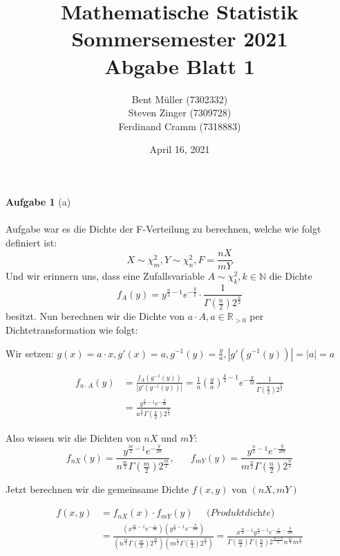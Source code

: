 \documentclass[12pt]{article}
\title{Mathematische Statistik \\ Sommersemester 2021 \\ Abgabe Blatt 1 \\}
\author{Bent Müller (7302332) \\ Steven Zinger (7309728) \\ Ferdinand Cramm (7318883)}
\date{April 16, 2021}
\begin{document}
\maketitle
\textbf{Aufgabe 1} (a) \\\\Aufgabe war es die Dichte der F-Verteilung zu berechnen, welche wie folgt definiert ist:
\[
	X \sim \chi^2_m, Y \sim \chi^2_n, F = \frac{nX}{mY}
\] 
Und wir erinnern uns, dass eine Zufallsvariable $A \sim \chi^2_k, k \in \mathbb{N}$ die Dichte
\[
	f_A(y) = y^{\frac{n}{2} - 1} e^{-\frac{y}{2}} \cdot
	\frac{1}{
		\Gamma(\frac{n}{2}) 2^{\frac{n}{2}}
	}
\]
besitzt.
Nun berechnen wir die Dichte von $a \cdot A, a \in \mathbb{R}_{>0}$ per Dichtetransformation wie folgt:

Wir setzen:
$
	g(x) = a \cdot x,
	g'(x) = a,
	g ^{-1} (y) = \frac{y}{a},
	|g' (g ^{-1} (y))| = |a| = a
$

\begin{align*}
	f_{a\cdot A}(y) &= \frac{ f_A ( g ^{-1} (y)) }{ | g' ( g ^{-1} (y) ) | }
	= \frac{ 1 }{ a } \left( \frac{ y }{ a } \right) ^{ \frac{ k }{ 2 } - 1 }
	e ^{- \frac{ y }{ 2a }} \frac{ 1 }{ \Gamma(\frac{ k }{ 2 }) 2 ^{\frac{ k }{ 2 }}}\\
					&= \frac{y ^{ \frac{ k }{ 2 } -1} e ^{ - \frac{ y }{ 2a }}}{
						a ^{ \frac{ k }{ 2 } } \Gamma(\frac{ k }{ 2 }) 2 ^{ \frac{ k }{ 2 } }
					}
\end{align*}

Also wissen wir die Dichten von $nX$ und $mY$:
\[
	f_{nX}(y) = \frac{ y ^{ \frac{ m }{ 2 } -1} e ^{ - \frac{ y }{ 2n }} }{ 
		n ^{ \frac{ m }{ 2 } } \Gamma(\frac{ m }{ 2}) 2 ^{\frac{ m }{ 2 }}
	},\;\;\;\;\;\;
	f_{mY}(y) = \frac{ y ^{ \frac{ n }{ 2 } -1} e ^{ - \frac{ y }{ 2m }} }{ 
		m ^{ \frac{ n }{ 2 } } \Gamma(\frac{ n }{ 2}) 2 ^{\frac{ n }{ 2 }}
	}
\] 

Jetzt berechnen wir die gemeinsame Dichte $f(x, y)$ von $(nX, mY)$

\begin{align*}
	f(x, y) &= f_{nX}(x) \cdot f_{mY}(y) \;\;\;\;\; \textit{(Produktdichte)} \\
			&= \frac{ 
				\left( x ^{\frac{ m }{ 2 }-1} e ^{- \frac{ x }{ 2n }} \right) 
				\left( y ^{\frac{ n }{ 2 }-1} e ^{- \frac{ y }{ 2m }} \right) 
				}{  
				\left( n ^{\frac{ m }{ 2 }} \Gamma(\frac{ m }{ 2 }) 2 ^{\frac{ m }{ 2 }} \right) 
				\left( m ^{\frac{ n }{ 2 }} \Gamma(\frac{ n }{ 2 }) 2 ^{\frac{ n }{ 2 }} \right)
			}
			= \frac{ 
				x ^{\frac{ m }{ 2 } - 1} y ^{\frac{ n }{ 2 }-1} e ^ {-\frac{ x }{ 2n } -\frac{ y }{ 2m }}
				}{  
				\Gamma(\frac{ m }{ 2 }) \Gamma(\frac{ n }{ 2 })
				2 ^{\frac{ m+n }{ 2 }} 
				n ^{\frac{ m }{ 2 }} m ^{\frac{ n }{ 2 }}
			}
\end{align*}
\end{document}
